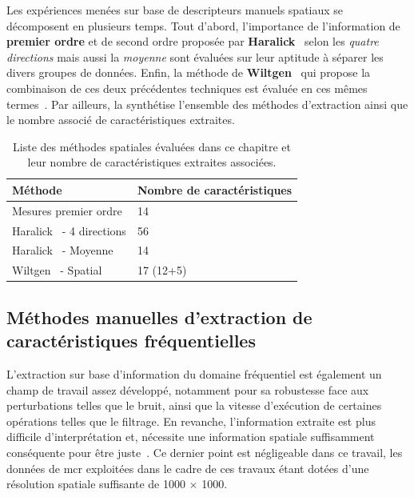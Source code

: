 Les expériences menées sur base de descripteurs manuels spatiaux se décomposent en plusieurs temps. Tout d'abord, l'importance de l'information de \textbf{premier ordre} et de second ordre proposée par \textbf{Haralick}~ selon les \textit{quatre directions} mais aussi la \textit{moyenne} sont évaluées sur leur aptitude à séparer les divers groupes de données. Enfin, la méthode de \textbf{Wiltgen}~ qui propose la combinaison de ces deux précédentes techniques est évaluée en ces mêmes termes~\cite{Wiltgen2008}. Par ailleurs, la  synthétise l'ensemble des méthodes d'extraction ainsi que le nombre associé de caractéristiques extraites.\par
\begin{table}[h]
    \centering
    \begin{tabular}{ll}
        \toprule
        \textbf{Méthode}                            & \textbf{Nombre de caractéristiques}   \\ \hline
        Mesures premier ordre                       & 14                                    \\ \hline
        Haralick~\cite{Haralick1973} - 4 directions & 56                                    \\ \hline
        Haralick~\cite{Haralick1973} - Moyenne      & 14                                    \\ \hline
        Wiltgen~\cite{Wiltgen2008} - Spatial        & 17 (12+5)                             \\
        \bottomrule                 
    \end{tabular}
    \caption{Liste des méthodes spatiales évaluées dans ce chapitre et leur nombre de caractéristiques extraites associées.}
    \label{tab:number_features_spatial}
\end{table}
\clearpage

\subsection{Méthodes manuelles d'extraction de caractéristiques fréquentielles}
L'extraction sur base d'information du domaine fréquentiel est également un champ de travail assez développé, notamment pour sa robustesse face aux perturbations telles que le bruit, ainsi que la vitesse d'exécution de certaines opérations telles que le filtrage. En revanche, l'information extraite est plus difficile d'interprétation et, nécessite une information spatiale suffisamment conséquente pour être juste~\cite{Kamila2015}. Ce dernier point est négligeable dans ce travail, les données de \gls{mcr} exploitées dans le cadre de ces travaux étant dotées d'une résolution spatiale suffisante de \SI{1000}{\px} $\times$ \SI{1000}{\px}.\par

